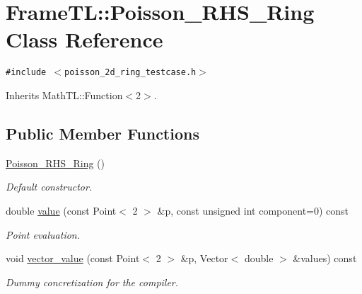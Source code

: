 \hypertarget{classFrameTL_1_1Poisson__RHS__Ring}{
\section{FrameTL::Poisson\_\-RHS\_\-Ring Class Reference}
\label{classFrameTL_1_1Poisson__RHS__Ring}
}
{\tt \#include $<$poisson\_\-2d\_\-ring\_\-testcase.h$>$}

Inherits MathTL::Function$<$2$>$.

\subsection*{Public Member Functions}
\begin{CompactItemize}
\item 
\hypertarget{classFrameTL_1_1Poisson__RHS__Ring_ec87045bea1e955b26fef5deb5f3e1cd}{
\hyperlink{classFrameTL_1_1Poisson__RHS__Ring_ec87045bea1e955b26fef5deb5f3e1cd}{Poisson\_\-RHS\_\-Ring} ()}
\label{classFrameTL_1_1Poisson__RHS__Ring_ec87045bea1e955b26fef5deb5f3e1cd}

\begin{CompactList}\small\item\em Default constructor. \item\end{CompactList}\item 
\hypertarget{classFrameTL_1_1Poisson__RHS__Ring_eb52be0ea13b42de24b00c46de0009eb}{
double \hyperlink{classFrameTL_1_1Poisson__RHS__Ring_eb52be0ea13b42de24b00c46de0009eb}{value} (const Point$<$ 2 $>$ \&p, const unsigned int component=0) const }
\label{classFrameTL_1_1Poisson__RHS__Ring_eb52be0ea13b42de24b00c46de0009eb}

\begin{CompactList}\small\item\em Point evaluation. \item\end{CompactList}\item 
\hypertarget{classFrameTL_1_1Poisson__RHS__Ring_b10dc4b7421c873161adc2f3c3505193}{
void \hyperlink{classFrameTL_1_1Poisson__RHS__Ring_b10dc4b7421c873161adc2f3c3505193}{vector\_\-value} (const Point$<$ 2 $>$ \&p, Vector$<$ double $>$ \&values) const }
\label{classFrameTL_1_1Poisson__RHS__Ring_b10dc4b7421c873161adc2f3c3505193}

\begin{CompactList}\small\item\em Dummy concretization for the compiler. \item\end{CompactList}\end{CompactItemize}



